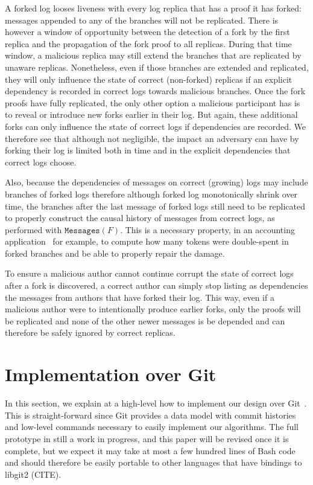 \documentclass[9pt, oneside]{article}   	%
\begin{document}
A forked log looses liveness with every log replica that has a proof it has forked: messages appended to any of the branches will not be replicated. There is however a window of opportunity between the detection of a fork by the first replica and the propagation of the fork proof to all replicas. During that time window, a malicious replica may still extend the branches that are replicated by unaware replicas. Nonetheless, even if those branches are extended and replicated, they will only influence the state of correct (non-forked) replicas if an explicit dependency is recorded in correct logs towards malicious branches. Once the fork proofs have fully replicated, the only other option a malicious participant has is to reveal or introduce new forks earlier in their log. But again, these additional forks can only influence the state of correct logs if dependencies are recorded. We therefore see that although not negligible, the impact an adversary can have by forking their log is limited both in time and in the explicit dependencies that correct logs choose.

Also, because the dependencies of messages on correct (growing) logs may include branches of forked logs therefore although forked log monotonically shrink over time, the branches after the last message of forked logs still need to be replicated to properly construct the causal history of messages from correct logs, as performed with $\texttt{Messages}(F)$. This is a necessary property, in an accounting application~\cite{lavoie2023gocledger} for example, to compute how many tokens were double-spent in forked branches and be able to properly repair the damage.

To ensure a malicious author cannot continue corrupt the state of correct logs after a fork is discovered, a correct author can simply stop listing as dependencies the messages from authors that have forked their log. This way, even if a malicious author were to intentionally produce earlier forks, only the proofs will be replicated and none of the other newer messages is be depended and can therefore be safely ignored by correct replicas.

\newpage
\section{Implementation over Git}
\label{sec:git-implementation}

In this section, we explain at a high-level how to implement our design over Git~\cite{git}. This is straight-forward since Git provides a data model with commit histories and low-level commands necessary to easily implement our algorithms. The full prototype in still a work in progress, and this paper will be revised once it is complete, but we expect it may take at most a few hundred lines of Bash code and should therefore be easily portable to other languages that have bindings to libgit2 (CITE).
\end{document}
